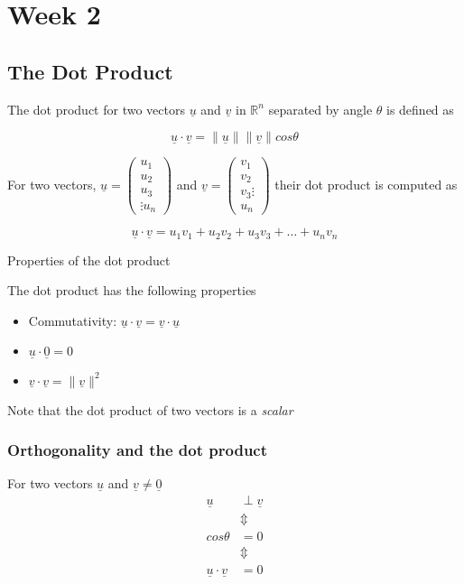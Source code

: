 \chapter{Week 2}

\section{The Dot Product}
The dot product for two vectors $\underline{u}$ and $\underline{v}$ in $\mathbb{R}^n$ separated by angle $\theta$ is defined as
\begin{framed}
   \[
     \underline{u} \cdot \underline{v} = \lVert \underline{u} \rVert \lVert \underline{v} \rVert cos \theta
   \] 
\end{framed}

For two vectors, $\underline{u} =  \begin{pmatrix} u_1 \\ u_2 \\u_3\\ \vdots u_n\end{pmatrix}$ and $ \underline{v} = \begin{pmatrix} v_1 \\ v_2 \\ v_3  \vdots \\ u_n \end{pmatrix}$ their dot product is computed as
\begin{framed} 
   \[
     \underline{u} \cdot \underline{v} = u_1 v_1 + u_2 v_2 + u_3 v_3 + \hdots + u_n v_n
   \] 
\end{framed}

Properties of the dot product
\begin{framed}
The dot product has the following properties
   \begin{itemize}
      \item Commutativity: $ \underline{u} \cdot \underline{v} = \underline{v} \cdot \underline{u}$ 
      \item $ \underline{u} \cdot \underline{0} = 0$ 
      \item $\underline{v} \cdot \underline{v} = \lVert \underline{v} \rVert ^2$
   \end{itemize}
   Note that the dot product of two vectors is a \emph{scalar}
\end{framed}

\subsection{Orthogonality and the dot product}
\begin{framed}
For two vectors $ \underline{u}$ and $ \underline{v} \neq  \underline{0}$
   \begin{align*}
       \underline{u} &\perp \underline{v}  \\
                     &\Updownarrow \\
      cos \theta &= 0 \\
                 &\Updownarrow \\
      \underline{u} \cdot \underline{v} &= 0
   \end{align*}
\end{framed}

